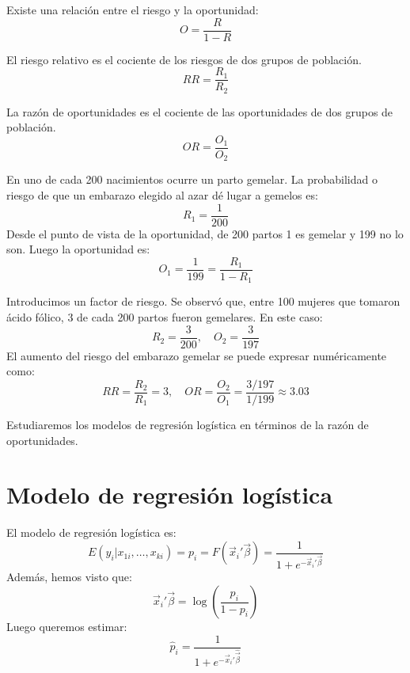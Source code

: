 \begin{remark}
    Existe una relación entre el riesgo y la oportunidad:
    $$O = \frac{R}{1-R}$$
\end{remark}

\begin{definition}
    El riesgo relativo es el cociente de los riesgos de dos grupos de población.
    $$RR = \frac{R_1}{R_2}$$
\end{definition}

\begin{definition}
    La razón de oportunidades es el cociente de las oportunidades de dos grupos de población.
    $$OR = \frac{O_1}{O_2}$$
\end{definition}

\begin{example}
    En uno de cada 200 nacimientos ocurre un parto gemelar.
    La probabilidad o riesgo de que un embarazo elegido al azar dé lugar a gemelos es:
    $$R_1 = \frac{1}{200}$$
    Desde el punto de vista de la oportunidad, de 200 partos 1 es gemelar y 199 no lo son.
    Luego la oportunidad es:
    $$O_1 = \frac{1}{199} = \frac{R_1}{1-R_1}$$

    Introducimos un factor de riesgo.
    Se observó que, entre 100 mujeres que tomaron ácido fólico, 3 de cada 200 partos fueron gemelares.
    En este caso:
    $$R_2 = \frac{3}{200}, \quad O_2 = \frac{3}{197}$$
    El aumento del riesgo del embarazo gemelar se puede expresar numéricamente como:
    $$RR = \frac{R_2}{R_1} = 3, \quad OR = \frac{O_2}{O_1} = \frac{3/197}{1/199} \approx 3.03$$

    Estudiaremos los modelos de regresión logística en términos de la razón de oportunidades.
\end{example}

\section{Modelo de regresión logística}
El modelo de regresión logística es:
$$E(y_i | x_{1i}, \dots, x_{ki}) = p_i = F(\vec{x}_i'\vec{\beta}) = \frac{1}{1 + e^{-\vec{x}_i'\vec{\beta}}}$$
Además, hemos visto que:
$$\vec{x}_i'\vec{\beta} = \log\left(\frac{p_i}{1-p_i}\right)$$
Luego queremos estimar:
$$\hat{p}_i = \frac{1}{1 + e^{-\vec{x}_i'\hat{\vec{\beta}}}}$$

